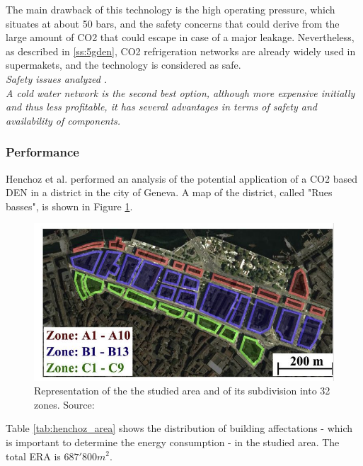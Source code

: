 \documentclass{article}
\begin{document}
The main drawback of this technology is the high operating pressure, which situates at about 50 bars, and the safety concerns that could derive from the large amount of CO2 that could escape in case of a major leakage. Nevertheless, as described in \ref{ss:5gden}, CO2 refrigeration networks are already widely used in supermakets, and the technology is considered as safe. \\
\textit{Safety issues analyzed \cite{girardinSafetyIssuesCO2based2016}.\\}
\textit{A cold water network is the second best option, although more expensive initially and thus less profitable, it has several advantages in terms of safety and availability of components.}

\subsubsection{Performance}
Henchoz et al.\cite{henchozPotentialRefrigerantBased} performed an analysis of the potential application of a CO2 based DEN in a district in the city of Geneva. A map of the district, called "Rues basses", is shown in Figure \ref{fig:henchoz_gva}.

\begin{figure}[h!]
\centering
\includegraphics[width=1\textwidth]{henchoz_gva.JPG}
\caption{Representation of the the studied area and of its subdivision into 32 zones. Source: \cite{henchozPotentialRefrigerantBased}}
\label{fig:henchoz_gva}
\end{figure}

Table \ref{tab:henchoz_area} shows the distribution of building affectations - which is important to determine the energy consumption - in the studied area. The total ERA is $687'800 m^{2}$.\\
\end{document}
